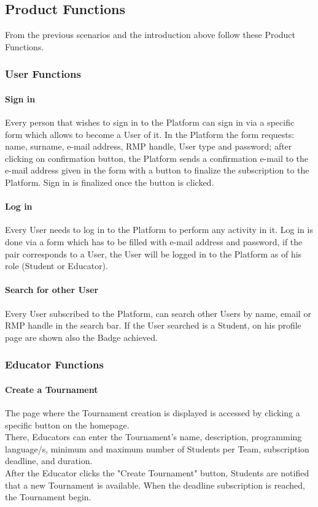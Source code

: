 \subsection{Product Functions}
From the previous scenarios and the introduction above follow these Product Functions.

\subsubsection{User Functions}
\paragraph{Sign in}
Every person that wishes to sign in to the Platform can sign in via a specific form which allows to become a User of it.
In the Platform the form requests: name, surname, e-mail address, RMP handle, User type and password; after clicking on confirmation button, the Platform sends a confirmation e-mail to the e-mail address given in the form with a 
button to finalize the subscription to the Platform. Sign in is finalized once the button is clicked.
\paragraph{Log in}
Every User needs to log in to the Platform to perform any activity in it. Log in is done via a form which has to be filled with e-mail address and password, if the pair corresponds to a User, the User will be logged in to the 
Platform as of his role (Student or Educator).
\paragraph{Search for other User}
Every User subscribed to the Platform, can search other Users by name, email or RMP handle in the search bar. If the User searched is a Student, on his profile page are shown also the Badge achieved.

\subsubsection{Educator Functions}
\paragraph{Create a Tournament}
The page where the Tournament creation is displayed is accessed by clicking a specific button on the homepage.\\
There, Educators can enter the Tournament's name, description, programming language/s, minimum and maximum number of Students per Team, subscription deadline, and duration.\\ 
After the Educator clicks the "Create Tournament" button, Students are notified that a new Tournament is available.
When the deadline subscription is reached, the Tournament begin.
